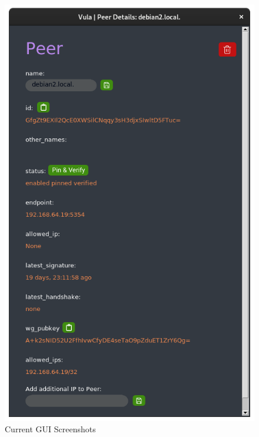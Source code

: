 \documentclass[
    type=projectproposal,
    twocolumn
]{bfhpub}
\begin{document}
\begin{figure}[ht]
\begin{minipage}{0.49\linewidth}
        \includegraphics[width=\linewidth]{./../misc/frontend/peer.png}
    \end{minipage}
    \caption{Current GUI Screenshots}
\end{figure}
\end{document}
